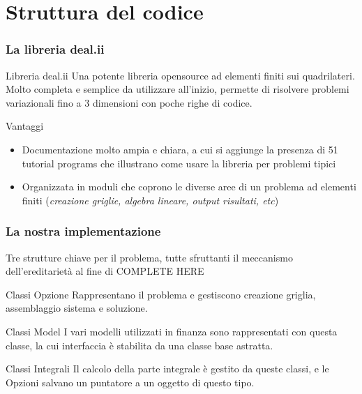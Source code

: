 \documentclass{beamer}
\begin{document}
\section{Struttura del codice}

\begin{frame}
\frametitle{La libreria \textsf{deal.ii}}
\begin{block}{Libreria \textsf{deal.ii}}
Una potente libreria opensource ad elementi finiti sui quadrilateri. Molto completa e semplice da utilizzare all'inizio, permette di risolvere problemi variazionali fino a 3 dimensioni con poche righe di codice. 
\end{block}

\pause
\begin{block}{Vantaggi}
 \begin{itemize}
  \item Documentazione molto ampia e chiara, a cui si aggiunge la presenza di 51 tutorial programs che illustrano come usare la libreria per problemi tipici
  \item Organizzata in moduli che coprono le diverse aree di un problema ad elementi finiti (\emph{creazione griglie, algebra lineare, output risultati, etc})
 \end{itemize}
\end{block}
\end{frame}

\begin{frame}
\frametitle{La nostra implementazione }
 Tre strutture chiave per il problema, tutte sfruttanti il meccanismo dell'ereditarietà al fine di COMPLETE HERE
 \begin{block}{Classi Opzione}
Rappresentano il problema e gestiscono creazione griglia, assemblaggio sistema e soluzione.
 \end{block}
 \begin{block}{Classi Model}
 I vari modelli utilizzati in finanza sono rappresentati con questa classe, la cui interfaccia è stabilita da una classe base astratta.
 \end{block}
 \begin{block}{Classi Integrali}
  Il calcolo della parte integrale è gestito da queste classi, e le Opzioni salvano un puntatore a un oggetto di questo tipo. 
 \end{block}
\end{frame}
\end{document}
